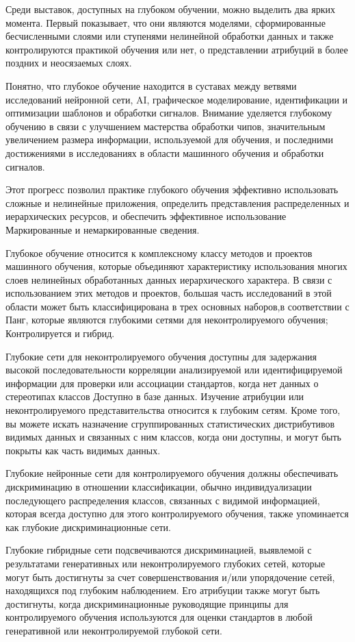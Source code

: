 Среди выставок, доступных на глубоком обучении, можно выделить два ярких момента. Первый показывает, что они являются моделями,
сформированные бесчисленными слоями или ступенями нелинейной обработки данных и также контролируются практикой обучения или нет,
о представлении атрибуций в более поздних и неосязаемых слоях.

Понятно, что глубокое обучение находится в суставах между ветвями исследований нейронной сети, AI,
графическое моделирование, идентификации и оптимизации шаблонов и обработки сигналов.
Внимание уделяется глубокому обучению в связи с улучшением мастерства обработки чипов,
значительным увеличением размера информации, используемой для обучения,
и последними достижениями в исследованиях в области машинного обучения и обработки сигналов.

Этот прогресс позволил практике глубокого обучения эффективно использовать сложные и нелинейные приложения,
определить представления распределенных и иерархических ресурсов,
и обеспечить эффективное использование Маркированные и немаркированные сведения.

Глубокое обучение относится к комплексному классу методов и проектов машинного обучения, которые объединяют характеристику
использования многих слоев нелинейных обработанных данных иерархического характера. В связи с использованием этих методов и проектов,
большая часть исследований в этой области может быть классифицирована в трех основных наборов,в соответствии с Панг,
которые являются глубокими сетями для неконтролируемого обучения; Контролируется и гибрид.

Глубокие сети для неконтролируемого обучения доступны для задержания высокой последовательности корреляции анализируемой или идентифицируемой информации для проверки или ассоциации стандартов,
когда нет данных о стереотипах классов Доступно в базе данных.
Изучение атрибуции или неконтролируемого представительства относится к глубоким сетям. Кроме того,
вы можете искать назначение сгруппированных статистических дистрибутивов видимых данных и связанных с ним классов,
когда они доступны, и могут быть покрыты как часть видимых данных.

Глубокие нейронные сети для контролируемого обучения должны обеспечивать дискриминацию в отношении классификации,
обычно индивидуализации последующего распределения классов, связанных с видимой информацией,
которая всегда доступно для этого контролируемого обучения, также упоминается как глубокие дискриминационные сети.

Глубокие гибридные сети подсвечиваются дискриминацией, выявлемой с результатами генеративных или неконтролируемого глубоких сетей, которые могут быть достигнуты за счет
совершенствования и/или упорядочение сетей, находящихся под глубоким наблюдением. Его атрибуции также могут быть достигнуты,
когда дискриминационные руководящие принципы для контролируемого обучения используются для оценки стандартов в любой генеративной или неконтролируемой глубокой сети.

